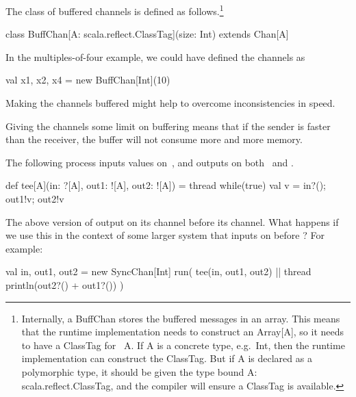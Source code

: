 \documentclass[notes,color]{sepslide0}
\begin{document}

\begin{slide}

The class of buffered channels is defined as follows.\footnote{Internally, a
  {\scalashape BuffChan} stores the buffered messages in an array.  This means
  that the runtime implementation needs to construct an {\scalashape
    Array[A]}, so it needs to have a {\scalashape ClassTag} for~{\scalashape
    A}.  If {\scalashape A} is a concrete type, e.g.~{\scalashape Int}, then
  the runtime implementation can construct the {\scalashape ClassTag}.  But if
  {\scalashape A} is declared as a polymorphic type, it should be given the
  type bound {\scalashape A: scala.reflect.ClassTag}, and the compiler will
  ensure a {\scalashape ClassTag} is available.}
%
\begin{scala}
class BuffChan[A: scala.reflect.ClassTag](size: Int) extends Chan[A]
\end{scala}


\vfill
\end{slide}


\begin{slide}

In the multiples-of-four example, we could have defined the channels as 
%
\begin{scala}
  val x1, x2, x4 = new BuffChan[Int](10)
\end{scala}

Making the channels buffered might help to overcome inconsistencies in speed. 

Giving the channels some limit on buffering means that if the sender is faster
than the receiver, the buffer will not consume more and more memory.  
\end{slide}



\begin{slide}

The following process inputs values on~, and outputs on
both~ and .
%
\begin{scala}
def tee[A](in: ?[A], out1: ![A], out2: ![A]) = thread{
  while(true){ val v = in?(); out1!v; out2!v }
}
\end{scala}

The above version of  output on its 
channel before its  channel.
What happens if we use this in the context of some larger system that inputs
on  before ?  For example:
\begin{scala}
val in, out1, out2 = new SyncChan[Int]
run( tee(in, out1, out2) || thread{ println(out2?() + out1?()) } )
\end{scala}
\end{slide}
\end{document}
